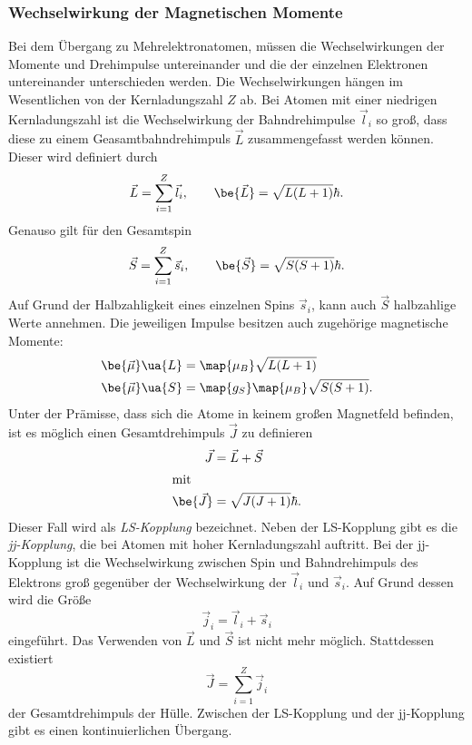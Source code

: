\subsubsection{Wechselwirkung der Magnetischen Momente}

Bei dem Übergang zu Mehrelektronatomen, müssen die Wechselwirkungen der Momente und Drehimpulse untereinander und %
die der einzelnen Elektronen untereinander unterschieden werden. Die Wechselwirkungen hängen im Wesentlichen %
von der Kernladungszahl $Z$ ab.
Bei Atomen mit einer niedrigen Kernladungszahl ist die Wechselwirkung der Bahndrehimpulse $\vec{l}_i$ so groß, dass diese zu einem
Geasamtbahndrehimpuls $\vec{L}$ zusammengefasst werden können. Dieser wird definiert durch
\begin{equation*}
  \vec{L}=\sum_{i=1}^{Z} \vec{l}_i, \qquad \be{\vec{L}}=\sqrt{L(L+1)}\hbar.
\end{equation*}
Genauso gilt für den Gesamtspin
\begin{equation*}
  \vec{S}=\sum_{i=1}^{Z} \vec{s}_i, \qquad \be{\vec{S}}=\sqrt{S(S+1)}\hbar.
\end{equation*}
Auf Grund der Halbzahligkeit eines einzelnen Spins $\vec{s}_i$, kann auch $\vec{S}$ halbzahlige Werte annehmen.
Die jeweiligen Impulse besitzen auch zugehörige magnetische Momente:
\begin{align*}
  \be{\vec{\mu}}\ua{L}&=\map{\mu_B}\sqrt{L(L+1)}\\
  \be{\vec{\mu}}\ua{S}&=\map{g_S}\map{\mu_B}\sqrt{S(S+1)}.
\end{align*}
Unter der Prämisse, dass sich die Atome in keinem großen Magnetfeld befinden, ist es möglich einen Gesamtdrehimpuls $\vec{J}$ zu
definieren
\begin{align*}
  \vec{J}&=\vec{L}+\vec{S}\\
\shortintertext{mit}
\be{\vec{J}}&=\sqrt{J(J+1)}\hbar.
\end{align*}
Dieser Fall wird als \emph{LS-Kopplung} bezeichnet.
Neben der LS-Kopplung gibt es die \emph{jj-Kopplung}, die bei Atomen mit hoher Kernladungszahl auftritt.
Bei der jj-Kopplung ist die Wechselwirkung zwischen Spin und Bahndrehimpuls des Elektrons groß gegenüber der Wechselwirkung der $\vec{l}_i$ und
$\vec{s}_i$. Auf Grund dessen wird die Größe
\begin{equation*}
  \vec{j}_i=  \vec{l}_i+  \vec{s}_i
\end{equation*}
eingeführt. Das Verwenden von $\vec{L}$ und $\vec{S}$ ist nicht mehr möglich. %
Stattdessen existiert
\begin{equation*}
  \vec{J}=\sum_{i=1}^{Z} \vec{j}_i
\end{equation*}
der Gesamtdrehimpuls der Hülle.
Zwischen der LS-Kopplung und der jj-Kopplung gibt es einen kontinuierlichen Übergang. %

